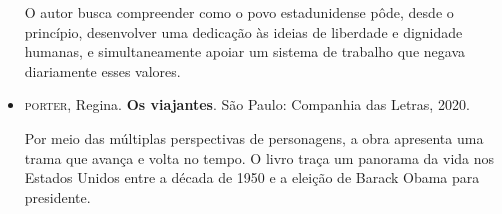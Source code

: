 \documentclass[11pt]{extarticle}
\begin{document}
\begin{itemize}
O autor busca compreender como o povo estadunidense pôde, desde o
princípio, desenvolver uma dedicação às ideias de liberdade e dignidade
humanas, e simultaneamente apoiar um sistema de trabalho que negava
diariamente esses valores.

\item\textsc{porter}, Regina. \textbf{Os viajantes}. São Paulo: Companhia das
  Letras, 2020.

Por meio das múltiplas perspectivas de personagens, a obra apresenta uma
trama que avança e volta no tempo. O livro traça um panorama da vida nos
Estados Unidos entre a década de 1950 e a eleição de Barack Obama para
presidente.
\end{itemize}
\end{document}
